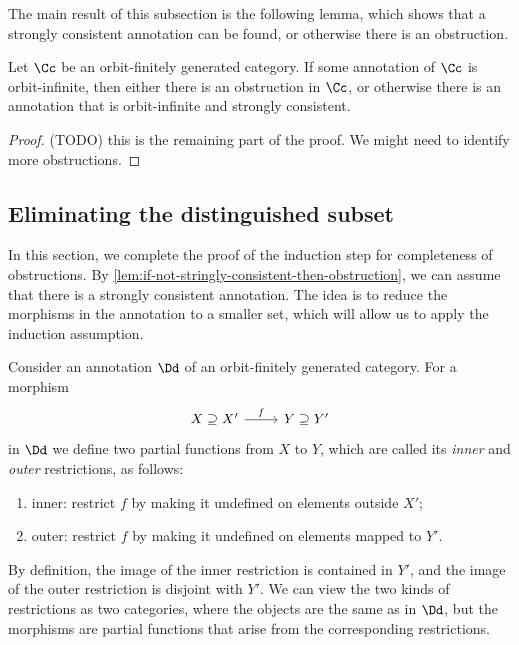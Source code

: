The main result of this subsection is the following lemma, which shows that a strongly consistent annotation can be found, or otherwise there is an obstruction.

\begin{lemma}\label{lem:if-not-stringly-consistent-then-obstruction}
    Let $\Cc$ be an orbit-finitely generated category. If some annotation of $\Cc$ is orbit-infinite, then either there is an obstruction in $\Cc$, or otherwise there is an annotation that  is orbit-infinite and strongly consistent.  
\end{lemma}
\begin{proof}
    (TODO) this is the remaining part of the proof. We might need to identify more obstructions.
\end{proof}


\subsection{Eliminating the distinguished subset}
\label{sec:reductions}

In this section, we complete the proof of the induction step for completeness of obstructions. By \cref{lem:if-not-stringly-consistent-then-obstruction}, we can assume that there is a strongly consistent annotation. The idea is to reduce the morphisms in the annotation to a smaller set, which will allow us to apply the induction assumption.

Consider an annotation $\Dd$ of an orbit-finitely generated category. For a morphism 
\[
\begin{tikzcd}
X \supseteq X' \ar[r, "f"] & Y \supseteq Y'
\end{tikzcd}
\]
in $\Dd$ we define two partial functions from $X$ to $Y$, which are called its \emph{inner} and \emph{outer} restrictions, as follows:
\begin{enumerate}
    \item inner: restrict $f$ by making it undefined on elements outside $X'$;
    \item outer: restrict $f$ by making it undefined on elements mapped to $Y'$.
\end{enumerate}
By definition, the image of the inner restriction is contained in $Y'$, and the image of the outer restriction is disjoint with $Y'$. We can view the two kinds of restrictions as two categories, where the objects are the same as in $\Dd$, but the morphisms are partial functions that arise from the corresponding restrictions.



